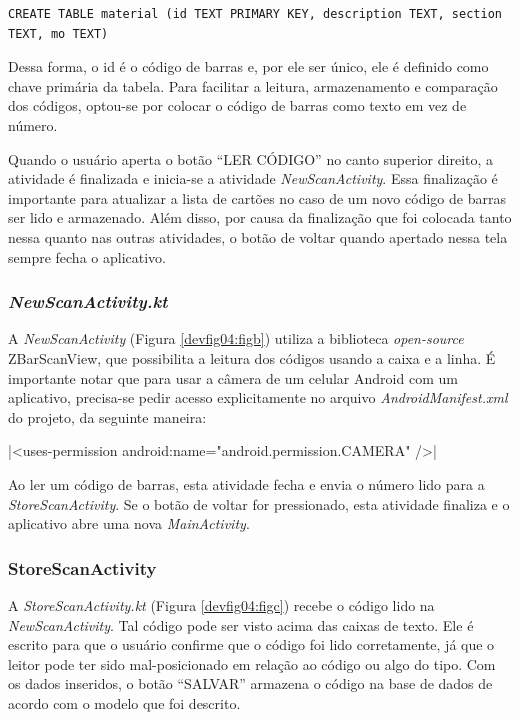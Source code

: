 \begin{verbatim}
CREATE TABLE material (id TEXT PRIMARY KEY, description TEXT, section TEXT, mo TEXT)
\end{verbatim}

Dessa forma, o id é o código de barras e, por ele ser único, ele é definido como chave primária da tabela. Para facilitar a leitura, armazenamento e comparação dos códigos, optou-se por colocar o código de barras como texto em vez de número.

Quando o usuário aperta o botão ``LER CÓDIGO'' no canto superior direito, a atividade é finalizada e inicia-se a atividade \textit{NewScanActivity}. Essa finalização é importante para atualizar a lista de cartões no caso de um novo código de barras ser lido e armazenado. Além disso, por causa da finalização que foi colocada tanto nessa quanto nas outras atividades, o botão de voltar quando apertado nessa tela sempre fecha o aplicativo.

\subsubsection*{\textit{NewScanActivity.kt}}

A \textit{NewScanActivity} (Figura \ref{devfig04:figb}) utiliza a biblioteca \textit{open-source} ZBarScanView, que possibilita a leitura dos códigos usando a caixa e a linha. É importante notar que para usar a câmera de um celular Android com um aplicativo, precisa-se pedir acesso explicitamente no arquivo \textit{AndroidManifest.xml} do projeto, da seguinte maneira:

\begin{center}
|<uses-permission android:name="android.permission.CAMERA" />|
\end{center}

Ao ler um código de barras, esta atividade fecha e envia o número lido para a \textit{StoreScanActivity}. Se o botão de voltar for pressionado, esta atividade finaliza e o aplicativo abre uma nova \textit{MainActivity}.

\subsubsection*{StoreScanActivity}

A \textit{StoreScanActivity.kt} (Figura \ref{devfig04:figc}) recebe o código lido na \textit{NewScanActivity}. Tal código pode ser visto acima das caixas de texto. Ele é escrito para que o usuário confirme que o código foi lido corretamente, já que o leitor pode ter sido mal-posicionado em relação ao código ou algo do tipo. Com os dados inseridos, o botão ``SALVAR'' armazena o código na base de dados de acordo com o modelo que foi descrito.

